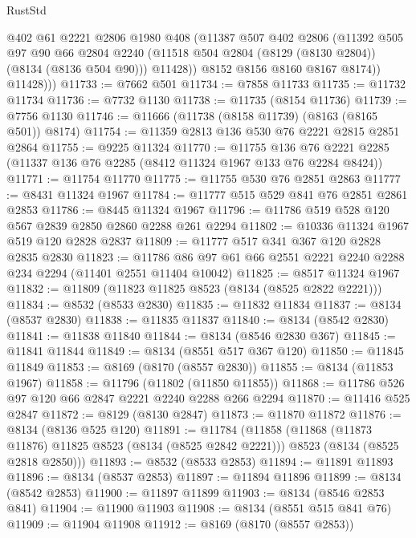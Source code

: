 \begin{lexlean}{RustStd}
\begin{coremodule}
{\begin{coremodule}
{{{{{{{{{{{{{{{{{{{{{{{{{{{{{{{{{{{{{{{{{{{{{{{{{{{{{              @402
              @61
              @2221
              @2806
              @1980
              @408
              (@11387
                @507
                @402
                @2806
                (@11392
                  @505
                  @97
                  @90
                  @66
                  @2804
                  @2240
                  (@11518 @504 @2804 (@8129 (@8130 @2804)) (@8134 (@8136 @504 @90)))
                  @11428))
              @8152
              @8156
              @8160
              @8167
              @8174))
          @11428)))
@11733 := @7662 @501
@11734 := @7858 @11733
@11735 := @11732 @11734
@11736 := @7732 @1130
@11738 := @11735 (@8154 @11736)
@11739 := @7756 @1130
@11746 := @11666 (@11738 (@8158 @11739) (@8163 (@8165 @501)) @8174)
@11754 := @11359 @2813 @136 @530 @76 @2221 @2815 @2851 @2864
@11755 := @9225 @11324
@11770 := @11755
    @136
    @76
    @2221
    @2285
    (@11337 @136 @76 @2285 (@8412 @11324 @1967 @133 @76 @2284 @8424))
@11771 := @11754 @11770
@11775 := @11755 @530 @76 @2851 @2863
@11777 := @8431 @11324 @1967
@11784 := @11777 @515 @529 @841 @76 @2851 @2861 @2853
@11786 := @8445 @11324 @1967
@11796 := @11786 @519 @528 @120 @567 @2839 @2850 @2860 @2288 @261 @2294
@11802 := @10336 @11324 @1967 @519 @120 @2828 @2837
@11809 := @11777 @517 @341 @367 @120 @2828 @2835 @2830
@11823 := @11786 @86 @97 @61 @66 @2551 @2221 @2240 @2288 @234 @2294 (@11401 @2551 @11404 @10042)
@11825 := @8517 @11324 @1967
@11832 := @11809 (@11823 @11825 @8523 (@8134 (@8525 @2822 @2221)))
@11834 := @8532 (@8533 @2830)
@11835 := @11832 @11834
@11837 := @8134 (@8537 @2830)
@11838 := @11835 @11837
@11840 := @8134 (@8542 @2830)
@11841 := @11838 @11840
@11844 := @8134 (@8546 @2830 @367)
@11845 := @11841 @11844
@11849 := @8134 (@8551 @517 @367 @120)
@11850 := @11845 @11849
@11853 := @8169 (@8170 (@8557 @2830))
@11855 := @8134 (@11853 @1967)
@11858 := @11796 (@11802 (@11850 @11855))
@11868 := @11786 @526 @97 @120 @66 @2847 @2221 @2240 @2288 @266 @2294
@11870 := @11416 @525 @2847
@11872 := @8129 (@8130 @2847)
@11873 := @11870 @11872
@11876 := @8134 (@8136 @525 @120)
@11891 := @11784
    (@11858
      (@11868 (@11873 @11876) @11825 @8523 (@8134 (@8525 @2842 @2221)))
      @8523
      (@8134 (@8525 @2818 @2850)))
@11893 := @8532 (@8533 @2853)
@11894 := @11891 @11893
@11896 := @8134 (@8537 @2853)
@11897 := @11894 @11896
@11899 := @8134 (@8542 @2853)
@11900 := @11897 @11899
@11903 := @8134 (@8546 @2853 @841)
@11904 := @11900 @11903
@11908 := @8134 (@8551 @515 @841 @76)
@11909 := @11904 @11908
@11912 := @8169 (@8170 (@8557 @2853))
}}}}}}}}}}}}}}}}}}}}}}}}}}}}}}}}}}}}}}}}}}}}}}}}}}}}}
\end{coremodule}}
\end{coremodule}
\end{lexlean}
